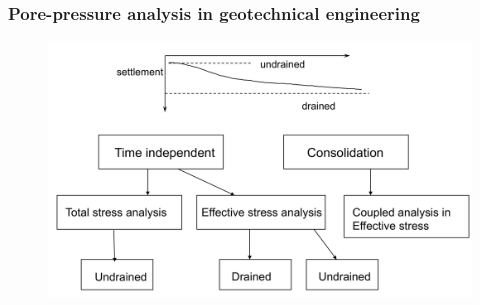 \documentclass[notes]{beamer}
\begin{document}
\begin{frame}
\frametitle{Pore-pressure analysis in geotechnical engineering}
\begin{figure}[ht]
	\centering
	\includegraphics[width=\textwidth]{figs/geotechnical-analysis.png}
\end{figure}
\end{frame}
\end{document}
